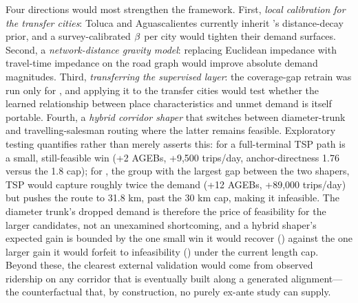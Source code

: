 Four directions would most strengthen the framework. First, \emph{local calibration for
the transfer cities}: Toluca and Aguascalientes currently inherit \zmg's distance-decay
prior, and a survey-calibrated $\beta$ per city would tighten their demand surfaces.
Second, a \emph{network-distance gravity model}: replacing Euclidean impedance with
travel-time impedance on the road graph would improve absolute demand magnitudes. Third,
\emph{transferring the supervised layer}: the coverage-gap retrain was run only for \zmg,
and applying it to the transfer cities would test whether the learned relationship between
place characteristics and unmet demand is itself portable. Fourth, a \emph{hybrid corridor
shaper} that switches between diameter-trunk and travelling-salesman routing where the
latter remains feasible. Exploratory testing quantifies rather than merely asserts this:
for  a full-terminal TSP path is a small, still-feasible win (+2 AGEBs, +9,500
trips/day, anchor-directness 1.76 versus the 1.8 cap); for , the group with
the largest gap between the two shapers, TSP would capture roughly twice the demand
(+12 AGEBs, +89,000 trips/day) but pushes the route to 31.8 km, past the 30 km cap, making
it infeasible. The diameter trunk's dropped demand is therefore the price of feasibility
for the larger candidates, not an unexamined shortcoming, and a hybrid shaper's expected
gain is bounded by the one small win it would recover () against the one
larger gain it would forfeit to infeasibility () under the current length
cap. Beyond these, the clearest external validation
would come from observed ridership on any corridor that is eventually built along a
generated alignment---the counterfactual that, by construction, no purely ex-ante study
can supply.
